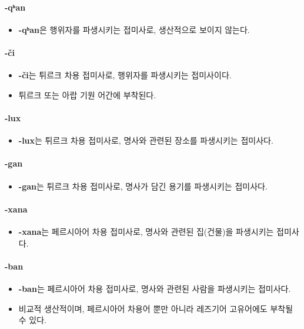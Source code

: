 \paragraph{-qʰan}
\begin{itemize}
\item \textbf{-qʰan}은 행위자를 파생시키는 접미사로, 생산적으로 보이지 않는다.
\end{itemize}
\paragraph{-či}
\begin{itemize}
\item \textbf{-či}는 튀르크 차용 접미사로, 행위자를 파생시키는 접미사이다.
\item 튀르크 또는 아랍 기원 어간에 부착된다.
\end{itemize}
\paragraph{-lux}
\begin{itemize}
\item \textbf{-lux}는 튀르크 차용 접미사로, 명사와 관련된 장소를 파생시키는 접미사다.
\end{itemize}
\paragraph{-gan}
\begin{itemize}
\item \textbf{-gan}는 튀르크 차용 접미사로, 명사가 담긴 용기를 파생시키는 접미사다.
\end{itemize}
\paragraph{-xana}
\begin{itemize}
\item \textbf{-xana}는 페르시아어 차용 접미사로, 명사와 관련된 집(건물)을 파생시키는 접미사다.
\end{itemize}
\paragraph{-ban}
\begin{itemize}
\item \textbf{-ban}는 페르시아어 차용 접미사로, 명사와 관련된 사람을 파생시키는 접미사다.
\item 비교적 생산적이며, 페르시아어 차용어 뿐만 아니라 레즈기어 고유어에도 부착될 수 있다.
\end{itemize}
